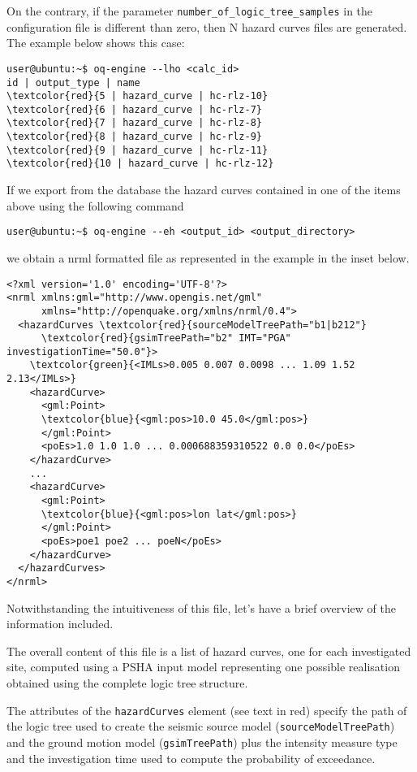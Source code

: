 On the contrary, if the parameter \texttt{number\_of\_logic\_tree\_samples}
in the configuration file is different than zero, then N hazard curves files 
are generated. The example below shows this case:
\begin{Verbatim}[frame=single, commandchars=\\\{\}, fontsize=\small]
user@ubuntu:~$ oq-engine --lho <calc_id>
id | output_type | name
\textcolor{red}{5 | hazard_curve | hc-rlz-10}
\textcolor{red}{6 | hazard_curve | hc-rlz-7}
\textcolor{red}{7 | hazard_curve | hc-rlz-8}
\textcolor{red}{8 | hazard_curve | hc-rlz-9}
\textcolor{red}{9 | hazard_curve | hc-rlz-11}
\textcolor{red}{10 | hazard_curve | hc-rlz-12}
\end{Verbatim}
If we export from the database the hazard curves contained in 
one of the items above using the following command
\begin{Verbatim}[frame=single, commandchars=\\\{\}, fontsize=\small]
user@ubuntu:~$ oq-engine --eh <output_id> <output_directory>
\end{Verbatim}
we obtain a nrml formatted file as represented in the example
in the inset below.
\begin{Verbatim}[frame=single, commandchars=\\\{\}, fontsize=\small]
<?xml version='1.0' encoding='UTF-8'?>
<nrml xmlns:gml="http://www.opengis.net/gml" 
      xmlns="http://openquake.org/xmlns/nrml/0.4">
  <hazardCurves \textcolor{red}{sourceModelTreePath="b1|b212"} 
      \textcolor{red}{gsimTreePath="b2" IMT="PGA" investigationTime="50.0"}>
    \textcolor{green}{<IMLs>0.005 0.007 0.0098 ... 1.09 1.52 2.13</IMLs>}
    <hazardCurve>
      <gml:Point>
      \textcolor{blue}{<gml:pos>10.0 45.0</gml:pos>}
      </gml:Point>
      <poEs>1.0 1.0 1.0 ... 0.000688359310522 0.0 0.0</poEs>
    </hazardCurve>
    ...
    <hazardCurve>
      <gml:Point>
      \textcolor{blue}{<gml:pos>lon lat</gml:pos>}
      </gml:Point>
      <poEs>poe1 poe2 ... poeN</poEs>
    </hazardCurve>
  </hazardCurves>
</nrml>
\end{Verbatim}
Not\-with\-stand\-ing the intuitiveness of this file, let's have a brief 
overview of the information included.

The overall content of this file is a list of hazard curves, one for
each investigated site, computed using a PSHA input model representing
one possible realisation obtained using the complete logic tree structure. 

The attributes of the \texttt{hazardCurves} element (see text in 
red) specify the path of the logic tree 
used to create the seismic source model (\texttt{source\-Model\-TreePath}) 
and the ground motion model (\texttt{gsim\-Tree\-Path}) plus the 
intensity measure type and the investigation time used to compute 
the probability of exceedance. 

